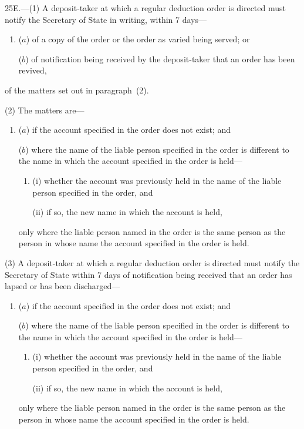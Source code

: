 \documentclass[12pt,a4paper]{article}
\begin{document}
25E.---(1)  A deposit-taker at which a regular deduction order is directed must notify the 
Secretary of State  %
in writing, within 7 days—
\begin{enumerate}\item[]
($a$) of a copy of the order or the order as varied being served; or

($b$) of notification being received by the deposit-taker that an order has been revived,
\end{enumerate}
of the matters set out in paragraph~(2).

(2) The matters are—
\begin{enumerate}\item[]
($a$) if the account specified in the order does not exist; and

($b$) where the name of the liable person specified in the order is different to the name in which the account specified in the order is held—
\begin{enumerate}\item[]
(i) whether the account was previously held in the name of the liable person specified in the order, and

(ii) if so, the new name in which the account is held,
\end{enumerate}
only where the liable person named in the order is the same person as the person in whose name the account specified in the order is held.
\end{enumerate}

(3) A deposit-taker at which a regular deduction order is directed must notify the 
Secretary of State  %
within 7 days of notification being received that an order has lapsed or has been discharged—
\begin{enumerate}\item[]
($a$) if the account specified in the order does not exist; and

($b$) where the name of the liable person specified in the order is different to the name in which the account specified in the order is held—
\begin{enumerate}\item[]
(i) whether the account was previously held in the name of the liable person specified in the order, and

(ii) if so, the new name in which the account is held,
\end{enumerate}
only where the liable person named in the order is the same person as the person in whose name the account specified in the order is held.
\end{enumerate}
\end{document}
